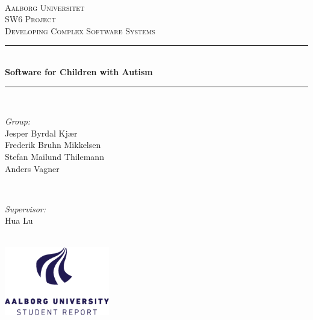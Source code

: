 %
\thispagestyle{empty}

\newcommand{\HRule}{\rule{\linewidth}{0.5mm}} %

\begin{center}
\textsc{}\\[0.5cm]

\textsc{\LARGE Aalborg Universitet}\\[0.8cm]
\textsc{\Large SW6 Project}\\[0.4cm]
\textsc{\large Developing Complex Software Systems}\\[0.4cm]

\HRule \\[0.4cm]
{ \huge \bfseries Software for Children with Autism}\\[0cm]
\HRule \\[0.8cm]
\begin{minipage}{0.4\textwidth}
\begin{flushleft} \large
\emph{Group:}\\
Jesper Byrdal Kjær\\
Frederik Bruhn Mikkelsen\\
Stefan Mailund Thilemann\\
Anders Vagner
\end{flushleft}
\end{minipage} 
~
\begin{minipage}{0.4\textwidth}
\begin{flushright} \large
\emph{Supervisor:}\\
Hua Lu
\end{flushright}
\end{minipage}\\[1.5cm]



\includegraphics[height=3cm]{figures/aauLogoEnStudent.png}
\vfill

\end{center}

